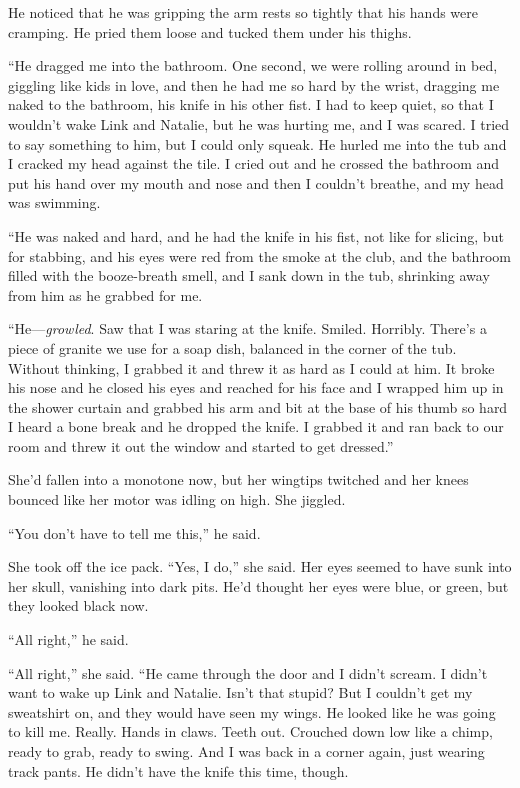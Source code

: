\documentclass{article}
\begin{document}
He noticed that he was gripping the arm rests so tightly that his
hands were cramping.  He pried them loose and tucked them under his
thighs.

``He dragged me into the bathroom.  One second, we were rolling around
in bed, giggling like kids in love, and then he had me so hard by the
wrist, dragging me naked to the bathroom, his knife in his other fist. 
I had to keep quiet, so that I wouldn't wake Link and Natalie, but he
was hurting me, and I was scared.  I tried to say something to him,
but I could only squeak.  He hurled me into the tub and I cracked my
head against the tile.  I cried out and he crossed the bathroom and
put his hand over my mouth and nose and then I couldn't breathe, and
my head was swimming.

``He was naked and hard, and he had the knife in his fist, not like
for slicing, but for stabbing, and his eyes were red from the smoke at
the club, and the bathroom filled with the booze-breath smell, and I
sank down in the tub, shrinking away from him as he grabbed for me.

``He---\textit{growled}.  Saw that I was staring at the knife. 
Smiled.  Horribly.  There's a piece of granite we use for a soap dish,
balanced in the corner of the tub.  Without thinking, I grabbed it and
threw it as hard as I could at him.  It broke his nose and he closed
his eyes and reached for his face and I wrapped him up in the shower
curtain and grabbed his arm and bit at the base of his thumb so hard I
heard a bone break and he dropped the knife.  I grabbed it and ran
back to our room and threw it out the window and started to get
dressed.''

She'd fallen into a monotone now, but her wingtips twitched and her
knees bounced like her motor was idling on high.  She jiggled.

``You don't have to tell me this,'' he said.

She took off the ice pack.  ``Yes, I do,'' she said.  Her eyes seemed
to have sunk into her skull, vanishing into dark pits.  He'd thought
her eyes were blue, or green, but they looked black now.

``All right,'' he said.

``All right,'' she said.  ``He came through the door and I didn't
scream.  I didn't want to wake up Link and Natalie.  Isn't that
stupid?  But I couldn't get my sweatshirt on, and they would have seen
my wings.  He looked like he was going to kill me.  Really.  Hands in
claws.  Teeth out.  Crouched down low like a chimp, ready to grab,
ready to swing.  And I was back in a corner again, just wearing track
pants.  He didn't have the knife this time, though.
\end{document}
